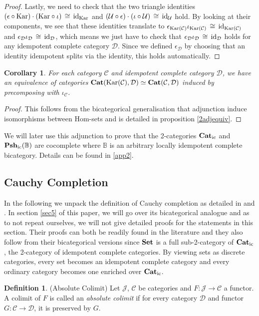 \documentclass[12pt,oneside,reqno,a4paper]{article}
\newtheorem{corollary}[theorem]{Corollary}
\theoremstyle{definition}
\newtheorem{definition}[theorem]{Definition}
\newcommand{\Set}{\textbf{\textup{Set}}}
\newcommand{\Cat}{\textbf{\textup{Cat}}}
\newcommand{\Catic}{\textbf{\textup{Cat}}_\textup{ic}}
\newcommand{\Pshic}[1]{\textbf{\textup{Psh}}_\textup{ic}(#1)}
\newcommand{\Kar}[1]{\textup{Kar}(#1)}
\newcommand{\Kartwo}{\textup{Kar}}
\newcommand{\iso}{\,\cong\,}
\newcommand{\id}{\textup{id}}
\newcommand{\C}{\mathcal{C}}
\newcommand{\D}{\mathcal{D}}
\newcommand{\J}{\mathcal{J}}
\newcommand{\U}{\mathcal{U}}
\newcommand{\bB}{\mathbb{B}}
\begin{document}
\begin{proof}
Lastly, we need to check that the two triangle identities $(\epsilon\circ\Kartwo)\cdot(\Kartwo\circ\iota)\iso\id_{\Kartwo}$ and ${(\U\circ\epsilon)\cdot(\iota\circ\U)}\iso\id_\U$ hold. By looking at their components, we see that these identities translate to $\epsilon_{\Kar{\C}}\iota_{\Kar{\C}}\iso\id_{\Kar{\C}}$ and $\epsilon_\D\iota_\D\iso\id_\D$, which means we just have to check that $\epsilon_\D\iota_\D\iso\id_\D$ holds for any idempotent complete category $\D$. Since we defined $\epsilon_\D$ by choosing that an identity idempotent splits via the identity, this holds automatically.
\end{proof}

\begin{corollary}\label{kar1equ}
For each category $\C$ and idempotent complete category $\D$, we have an equivalence of categories $\Cat(\Kar{\C},\D)\simeq\Cat(\C,\D)$ induced by precomposing with $\iota_\C$.
\end{corollary}

\begin{proof}
This follows from the bicategorical generalisation that adjunction induce isomorphisms between Hom-sets and is detailed in proposition \ref{2adjequiv}.
\end{proof}

We will later use this adjunction to prove that the 2-categories $\Catic$ and $\Pshic{\bB}$ are cocomplete where $\bB$ is an arbitrary locally idempotent complete bicategory. Details can be found in \ref{app2}. 

\subsection{Cauchy Completion} \label{1cau}

In the following we unpack the definition of Cauchy completion as detailed in \cite{L} and \cite{BD}. In section \ref{sec5} of this paper, we will go over its bicategorical analogue and as to not repeat ourselves, we will not give detailed proofs for the statements in this section. Their proofs can both be readily found in the literature and they also follow from their bicategorical versions since $\Set$ is a full sub-2-category of $\Catic$, the 2-category of idempotent complete categories. By viewing sets as discrete categories, every set becomes an idempotent complete category and every ordinary category becomes one enriched over $\Catic$.

\begin{definition}{(Absolute Colimit)}
Let $\J$, $\C$ be categories and $F:\J\to\C$ a functor. A colimit of $F$ is called an \textit{absolute colimit} if for every category $\D$ and functor $G:\C\to\D$, it is preserved by $G$.
\end{definition}
\end{document}
